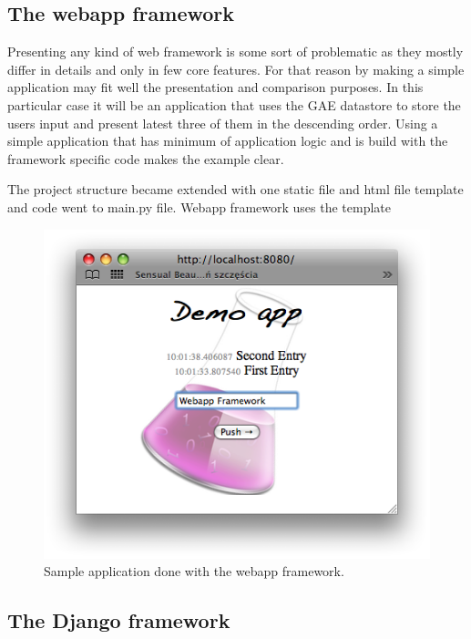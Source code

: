 \subsection{The webapp framework}\label{subsec:webapp}
Presenting any kind of web framework is some sort of problematic as they mostly differ in details and only in few core features. For that reason by making a simple application may fit well the presentation and comparison purposes. In this particular case it will be an application that uses the GAE datastore to store the users input and present latest three of them in the descending order. Using a simple application that has minimum of application logic and is build with the framework specific code makes the example clear. 

The project structure became extended with one static file and html file template and code went to main.py file. Webapp framework uses the template

\newpage


\begin{figure}[ht]
\begin{center}
\includegraphics[scale=0.6]{img/webapp_sample.png}
\caption{Sample application done with the webapp framework.}
\label{fig:webapp_sample}
\end{center}
\end{figure}

\subsection{The Django framework}\label{subsec:django}
